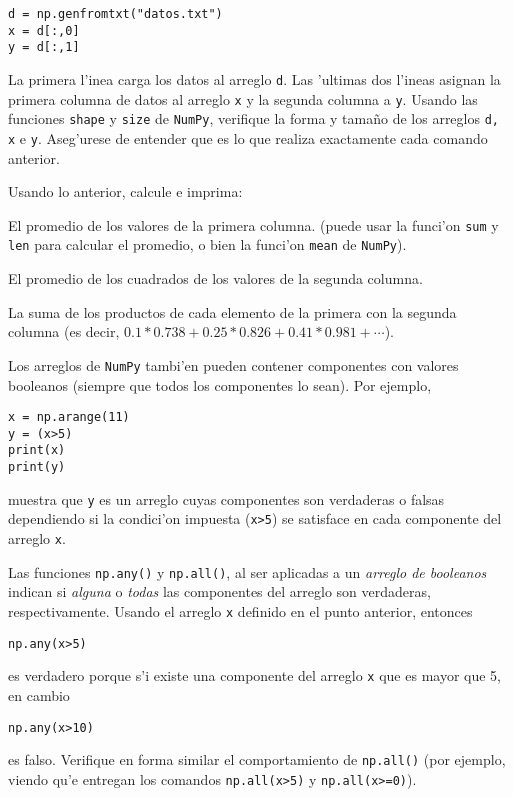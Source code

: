 \documentclass[11pt]{exam}
\begin{document}
\begin{questions}
\begin{verbatim}
d = np.genfromtxt("datos.txt")
x = d[:,0]
y = d[:,1]
\end{verbatim}

La primera l'inea carga los datos al arreglo \texttt{d}. Las 'ultimas dos l'ineas asignan la primera columna de datos al arreglo \texttt{x} y la segunda columna a \texttt{y}. Usando las funciones \texttt{shape} y \texttt{size} de \texttt{NumPy}, verifique la forma y tama\~no de los arreglos \texttt{d, x} e \texttt{y}. Aseg'urese de entender que es lo que realiza exactamente cada comando anterior.

\item Usando lo anterior, calcule e imprima:
\begin{parts}
\item El promedio de los valores de la primera columna. (puede usar la funci'on \texttt{sum} y \texttt{len} para calcular el promedio, o bien la funci'on \texttt{mean} de \texttt{NumPy}).
\item El promedio de los cuadrados de los valores de la segunda columna.
\item La suma de los productos de cada elemento de la primera con la segunda columna (es decir, $0.1*0.738 + 0.25 *	0.826 + 0.41 * 0.981 +\cdots$).
\end{parts}

\item Los arreglos de \texttt{NumPy} tambi'en pueden contener componentes con valores booleanos (siempre que todos los componentes lo sean). Por ejemplo,

\begin{verbatim}
x = np.arange(11)
y = (x>5)
print(x)
print(y)
\end{verbatim}

muestra que \texttt{y} es un arreglo cuyas componentes son verdaderas o falsas dependiendo si la condici'on impuesta (\texttt{x>5}) se satisface en cada componente del arreglo \texttt{x}.


\item Las funciones \texttt{np.any()} y \texttt{np.all()}, al ser aplicadas a un \textit{arreglo de booleanos} indican si \textit{alguna} o \textit{todas} las componentes del arreglo son verdaderas, respectivamente. Usando el arreglo \texttt{x} definido en el punto anterior, entonces

\begin{verbatim}
np.any(x>5)
\end{verbatim}

es verdadero porque s'i existe una componente del arreglo \texttt{x} que es mayor que 5, en cambio 
\begin{verbatim}
np.any(x>10)
\end{verbatim}
es falso. Verifique en forma similar el comportamiento de \texttt{np.all()} (por ejemplo, viendo qu'e entregan los comandos \texttt{np.all(x>5)} y \texttt{np.all(x>=0)}).
\end{questions}
\end{document}
